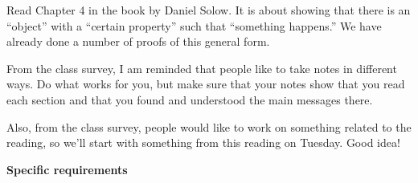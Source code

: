 
Read Chapter 4 in the book by Daniel Solow.
It is about showing that there is an ``object'' with a ``certain property'' such that ``something happens.''
We have already done a number of proofs of this general form.

From the class survey, I am reminded that people like to take notes in different ways.
Do what works for you, but make sure that your notes show that you read each section and that you found and understood the main messages there.

Also, from the class survey, people would like to work on something related to the reading, so we'll start with something from this reading on Tuesday.
Good idea!

\vspace{0.1in}
\noindent
{\bf Specific requirements}
\vspace*{-0.15in}

